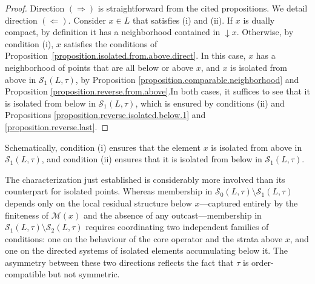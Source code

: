 \documentclass{article}
\newtheorem{theorem}{Theorem}[section]
\begin{document}
\begin{proof}
    Direction $(\Rightarrow)$ is straightforward from the cited propositions. We detail direction $(\Leftarrow)$. Consider $x \in L$ that satisfies (i) and (ii). If $x$ is dually compact, by definition it has a neighborhood contained in $\mathop{\downarrow}x$. Otherwise, by condition (i), $x$ satisfies the conditions of Proposition~\ref{proposition.isolated.from.above.direct}. In this case, $x$ has a neighborhood of points that are all below or above $x$, and $x$ is isolated from above in $\mathcal{S}_1(L,\tau)$, by Proposition \ref{proposition.comparable.neighborhood} and Proposition \ref{proposition.reverse.from.above}.In both cases, it suffices to see that it is isolated from below in $\mathcal{S}_1(L,\tau)$, which is ensured by conditions (ii) and Propositions \ref{proposition.reverse.isolated.below.1} and \ref{proposition.reverse.last}. 
\end{proof}

{Schematically, condition (i) ensures that the element $x$ is isolated from above in $\mathcal{S}_1(L,\tau)$, and condition (ii) ensures that it is isolated from below in $\mathcal{S}_1(L,\tau)$.}




The characterization just established is considerably more involved than its counterpart for isolated points. Whereas membership in \(\mathcal{S}_0(L,\tau)\setminus\mathcal{S}_1(L,\tau)\) depends only on the local residual structure below \(x\)---captured entirely by the finiteness of \(\mathcal{M}(x)\) and the absence of any outcast---membership in \(\mathcal{S}_1(L,\tau)\setminus\mathcal{S}_2(L,\tau)\) requires coordinating two independent families of conditions: one on the behaviour of the core operator and the strata above \(x\), and one on the directed systems of isolated elements accumulating below it. The asymmetry between these two directions reflects the fact that \(\tau\) is order-compatible but not symmetric.
\end{document}
